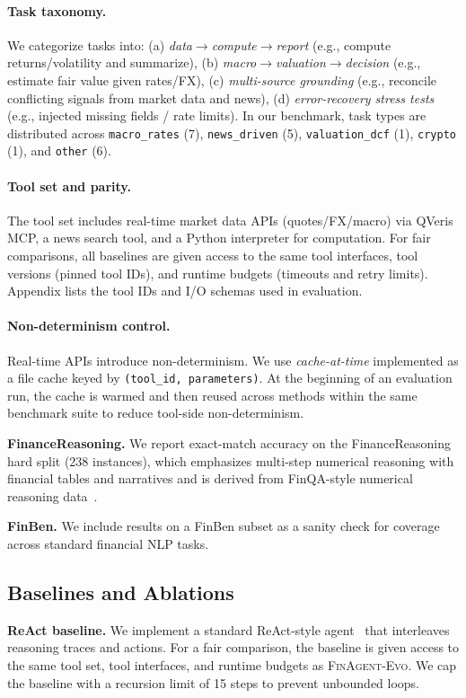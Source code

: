 \documentclass{article}
\begin{document}
\paragraph{Task taxonomy.}
We categorize tasks into: (a) \emph{data$\rightarrow$compute$\rightarrow$report} (e.g., compute returns/volatility and summarize),
(b) \emph{macro$\rightarrow$valuation$\rightarrow$decision} (e.g., estimate fair value given rates/FX),
(c) \emph{multi-source grounding} (e.g., reconcile conflicting signals from market data and news),
(d) \emph{error-recovery stress tests} (e.g., injected missing fields / rate limits).
In our benchmark, task types are distributed across \texttt{macro\_rates} (7), \texttt{news\_driven} (5), \texttt{valuation\_dcf} (1), \texttt{crypto} (1), and \texttt{other} (6).

\paragraph{Tool set and parity.}
The tool set includes real-time market data APIs (quotes/FX/macro) via QVeris MCP, a news search tool, and a Python interpreter for computation. For fair comparisons, all baselines are given access to the same tool interfaces, tool versions (pinned tool IDs), and runtime budgets (timeouts and retry limits). Appendix lists the tool IDs and I/O schemas used in evaluation.

\paragraph{Non-determinism control.}
Real-time APIs introduce non-determinism. We use \emph{cache-at-time} implemented as a file cache keyed by \texttt{(tool\_id, parameters)}. At the beginning of an evaluation run, the cache is warmed and then reused across methods within the same benchmark suite to reduce tool-side non-determinism.

\textbf{FinanceReasoning.}
We report exact-match accuracy on the FinanceReasoning hard split (238 instances), which emphasizes multi-step numerical reasoning with financial tables and narratives and is derived from FinQA-style numerical reasoning data~\citep{chen2021finqa}.

\textbf{FinBen.}
We include results on a FinBen subset as a sanity check for coverage across standard financial NLP tasks.

\subsection{Baselines and Ablations}
\textbf{ReAct baseline.}
We implement a standard ReAct-style agent~\citep{yao2023react} that interleaves reasoning traces and actions. For a fair comparison, the baseline is given access to the same tool set, tool interfaces, and runtime budgets as \textsc{FinAgent-Evo}. We cap the baseline with a recursion limit of 15 steps to prevent unbounded loops.
\end{document}
